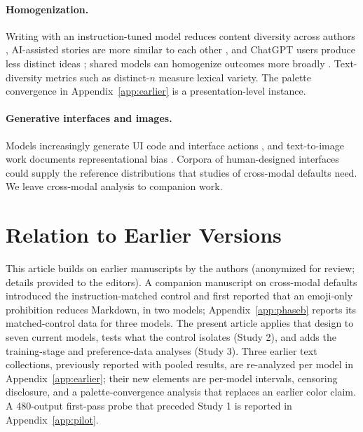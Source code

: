 \documentclass[acmsmall,screen,review,anonymous]{acmart}
\begin{document}
\paragraph{Homogenization.} Writing with an instruction-tuned model reduces content diversity across authors \cite{padmakumar2024writing}, AI-assisted stories are more similar to each other \cite{doshi2024generative}, and ChatGPT users produce less distinct ideas \cite{anderson2024homogenization}; shared models can homogenize outcomes more broadly \cite{bommasani2022picking}. Text-diversity metrics such as distinct-$n$ \cite{li2016diversity} measure lexical variety. The palette convergence in Appendix~\ref{app:earlier} is a presentation-level instance.

\paragraph{Generative interfaces and images.} Models increasingly generate UI code and interface actions \cite{wu2024uicoder,kong2026macaron}, and text-to-image work documents representational bias \cite{bianchi2022t2i,friedrich2024fairness}. Corpora of human-designed interfaces \cite{deka2017rico,wu2023webui} could supply the reference distributions that studies of cross-modal defaults need. We leave cross-modal analysis to companion work.

\section{Relation to Earlier Versions}
\label{sec:prior-versions}

This article builds on earlier manuscripts by the authors (anonymized for review; details provided to the editors). A companion manuscript on cross-modal defaults introduced the instruction-matched control and first reported that an emoji-only prohibition reduces Markdown, in two models; Appendix~\ref{app:phaseb} reports its matched-control data for three models. The present article applies that design to seven current models, tests what the control isolates (Study 2), and adds the training-stage and preference-data analyses (Study 3). Three earlier text collections, previously reported with pooled results, are re-analyzed per model in Appendix~\ref{app:earlier}; their new elements are per-model intervals, censoring disclosure, and a palette-convergence analysis that replaces an earlier color claim. A 480-output first-pass probe that preceded Study 1 is reported in Appendix~\ref{app:pilot}.
\end{document}
